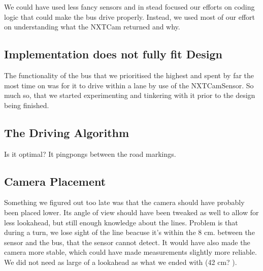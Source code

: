 We could have used less fancy sensors and in stead focused our efforts on coding logic that could make the bus drive properly. Instead, we used most of our effort on understanding what the NXTCam returned and why. 

\subsection{Implementation does not fully fit Design}
The functionality of the bus that we prioritised the highest and spent by far the most time on was for it to drive within a lane by use of the NXTCamSensor. So much so, that we started experimenting and tinkering with it prior to the design being finished. 

\subsection{The Driving Algorithm}
Is it optimal? It pingpongs between the road markings. 

\subsection{Camera Placement}
Something we figured out too late was that the camera should have probably been placed lower. Its angle of view should have been tweaked as well to allow for less lookahead, but still enough knowledge about the lines. Problem is that during a turn, we lose sight of the line beacuse it's within the 8  cm. between the sensor and the bus, that the sensor cannot detect. It would have also made the camera more stable, which could have made measurements slightly more reliable. We did not need as large of a lookahead as what we ended with (42 cm? ). 